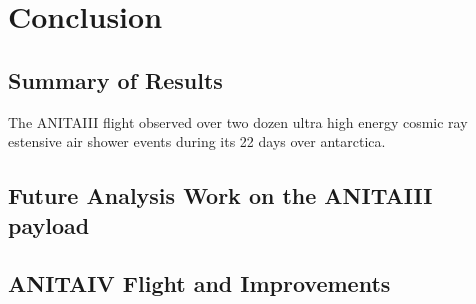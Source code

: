 			
\chapter{Conclusion}

\section{Summary of Results}
	The ANITAIII flight observed over two dozen ultra high energy cosmic ray estensive air shower events during its 22 days over antarctica.


\section{Future Analysis Work on the ANITAIII payload}


\section{ANITAIV Flight and Improvements}



